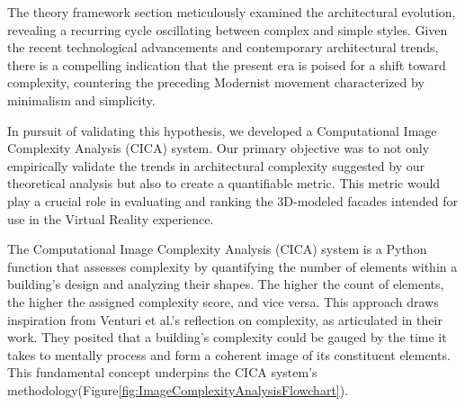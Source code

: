 The theory framework section meticulously examined the architectural evolution, revealing a recurring cycle oscillating between complex and simple styles.
Given the recent technological advancements and contemporary architectural trends, there is a compelling indication that the present era is poised for a shift toward complexity, countering the preceding Modernist movement characterized by minimalism and simplicity.

In pursuit of validating this hypothesis, we developed a Computational Image Complexity Analysis (CICA) system.
Our primary objective was to not only empirically validate the trends in architectural complexity suggested by our theoretical analysis but also to create a quantifiable metric.
This metric would play a crucial role in evaluating and ranking the 3D-modeled facades intended for use in the Virtual Reality experience.

The Computational Image Complexity  Analysis (CICA) system is a Python function that assesses complexity by quantifying the number of elements within a building's design and analyzing their shapes.
The higher the count of elements, the higher the assigned complexity score, and vice versa.
This approach draws inspiration from Venturi et al.'s reflection on complexity, as articulated in their work\cite{Venturi1977}.
They posited that a building's complexity could be gauged by the time it takes to mentally process and form a coherent image of its constituent elements.
This fundamental concept underpins the CICA system's methodology(Figure\ref{fig:ImageComplexityAnalysisFlowchart}).

